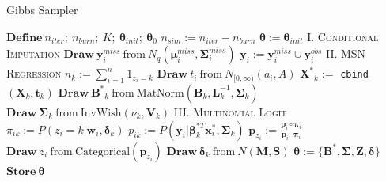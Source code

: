 \documentclass{article}
\begin{document}
\begin{algorithm}
\caption{Gibbs Sampler}
\label{alg:MCMC}
\begin{algorithmic}
\small
\linespread{0.5}
    \State $\mathbf{Define} \ n_{iter};\  n_{burn}; \ K; \ \boldsymbol\theta_{init}; \ \boldsymbol\theta_0$
    \State $n_{sim} := n_{iter} - n_{burn}$
    \State $\boldsymbol\theta := \boldsymbol\theta_{init}$
        \State \textsc{I. Conditional Imputation}
            \State $\mathbf{Draw} \ \mathbf{y}_i^{miss} \ \text{from} \ N_q(\boldsymbol\mu_i^{miss}, \boldsymbol\Sigma_i^{miss})$
            \State $\mathbf{y}_i := \mathbf{y}_i^{miss} \cup \mathbf{y}_i^{obs}$
         \EndFor
        \State \textsc{II. MSN Regression}
            \State $n_k := \sum_{i = 1}^n {1}_{z_i = k}$
              \State $\mathbf{Draw}\  t_i \ \text{from} \ N_{[0,\infty)}(a_i,A)$
            \EndFor
            \State $\mathbf{X^*}_k := $ \texttt{cbind}$(\mathbf{X}_k,\mathbf{t}_k)$
            \State $\mathbf{Draw} \ \mathbf{B^*}_k \ \text{from} \ \text{MatNorm}(\mathbf{B}_k,\mathbf{L}_k^{-1},\boldsymbol\Sigma_k)$
            \State $\mathbf{Draw} \ \boldsymbol\Sigma_k \ \text{from} \ \text{InvWish}(\nu_k, \mathbf{V}_k)$
          \EndFor
        \State \textsc{III. Multinomial Logit}
              \State $\pi_{ik} := P(z_i = k|\mathbf{w}_i,\boldsymbol\delta_k)$
              \State $p_{ik} := P(\mathbf{y}_i|\boldsymbol\beta_k^{*T} \mathbf{x}^*_i,\boldsymbol\Sigma_k)$
            \EndFor
            \State $\mathbf{p}_{z_i} := \frac{\mathbf{p}_i \circ \boldsymbol\pi_i}{\mathbf{p}_i \cdot \boldsymbol\pi_i}$
            \State $\mathbf{Draw} \ z_i \ \text{from} \ \text{Categorical}(\mathbf{p}_{z_i})$
              \State $\mathbf{Draw} \ \boldsymbol\delta_k \ \text{from} \ N(\mathbf{M},\mathbf{S})$
            \EndFor
          \EndFor
        \State $\boldsymbol\theta := \{\mathbf{B^*}, \boldsymbol\Sigma, \mathbf{Z}, \boldsymbol\delta \}$
        \State $\mathbf{Store} \ \boldsymbol\theta$
	  \EndFor
\end{algorithmic}
\end{algorithm}
\end{document}
